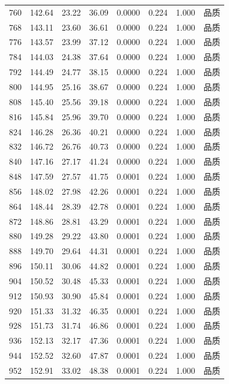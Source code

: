 \begin{longtable}{rrrrrrrr}
760 & 142.64 & 23.22 & 36.09 & 0.0000 & 0.224 & 1.000 & 品质 \\
768 & 143.11 & 23.60 & 36.61 & 0.0000 & 0.224 & 1.000 & 品质 \\
776 & 143.57 & 23.99 & 37.12 & 0.0000 & 0.224 & 1.000 & 品质 \\
784 & 144.03 & 24.38 & 37.64 & 0.0000 & 0.224 & 1.000 & 品质 \\
792 & 144.49 & 24.77 & 38.15 & 0.0000 & 0.224 & 1.000 & 品质 \\
800 & 144.95 & 25.16 & 38.67 & 0.0000 & 0.224 & 1.000 & 品质 \\
808 & 145.40 & 25.56 & 39.18 & 0.0000 & 0.224 & 1.000 & 品质 \\
816 & 145.84 & 25.96 & 39.70 & 0.0000 & 0.224 & 1.000 & 品质 \\
824 & 146.28 & 26.36 & 40.21 & 0.0000 & 0.224 & 1.000 & 品质 \\
832 & 146.72 & 26.76 & 40.73 & 0.0000 & 0.224 & 1.000 & 品质 \\
840 & 147.16 & 27.17 & 41.24 & 0.0000 & 0.224 & 1.000 & 品质 \\
848 & 147.59 & 27.57 & 41.75 & 0.0001 & 0.224 & 1.000 & 品质 \\
856 & 148.02 & 27.98 & 42.26 & 0.0001 & 0.224 & 1.000 & 品质 \\
864 & 148.44 & 28.39 & 42.78 & 0.0001 & 0.224 & 1.000 & 品质 \\
872 & 148.86 & 28.81 & 43.29 & 0.0001 & 0.224 & 1.000 & 品质 \\
880 & 149.28 & 29.22 & 43.80 & 0.0001 & 0.224 & 1.000 & 品质 \\
888 & 149.70 & 29.64 & 44.31 & 0.0001 & 0.224 & 1.000 & 品质 \\
896 & 150.11 & 30.06 & 44.82 & 0.0001 & 0.224 & 1.000 & 品质 \\
904 & 150.52 & 30.48 & 45.33 & 0.0001 & 0.224 & 1.000 & 品质 \\
912 & 150.93 & 30.90 & 45.84 & 0.0001 & 0.224 & 1.000 & 品质 \\
920 & 151.33 & 31.32 & 46.35 & 0.0001 & 0.224 & 1.000 & 品质 \\
928 & 151.73 & 31.74 & 46.86 & 0.0001 & 0.224 & 1.000 & 品质 \\
936 & 152.13 & 32.17 & 47.36 & 0.0001 & 0.224 & 1.000 & 品质 \\
944 & 152.52 & 32.60 & 47.87 & 0.0001 & 0.224 & 1.000 & 品质 \\
952 & 152.91 & 33.02 & 48.38 & 0.0001 & 0.224 & 1.000 & 品质 \\

\end{longtable}
